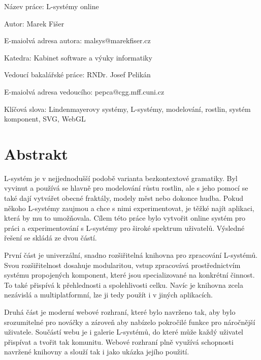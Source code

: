 %
{%
\setlength\parindent{0mm}%
\setlength\parskip{5mm}%
Název práce: L-systémy online

Autor: Marek Fišer

E-maiolvá adresa autora: malsys@marekfiser.cz

Katedra: Kabinet software a výuky informatiky

Vedoucí bakalářské práce: RNDr. Josef Pelikán

E-maiolvá adresa vedoucího: pepca@cgg.mff.cuni.cz

Klíčová slova: Lindenmayerovy systémy, L-systémy, modelování, rostlin, systém komponent, SVG, WebGL

\section*{Abstrakt}
}
\mbox{L-systém} je v nejjednodušší podobě varianta bezkontextové gramatiky.
Byl vyvi\-nut a používá se hlavně pro modelování růstu rostlin, ale s jeho pomocí se také dají vytvářet obecné fraktály, modely měst nebo dokonce hudba.
Pokud někoho \mbox{L-systémy} zaujmou a chce s nimi experimentovat, je těžké najít aplikaci, která by mu to umožňovala.
Cílem této práce bylo vytvořit online systém pro práci a experimentování s L-systémy pro široké spektrum uživatelů.
Výsledné řešení se skládá ze dvou částí.

První část je univerzální, snadno rozšiřitelná knihovna pro zpracování \mbox{L-sys}\-témů.
Svou rozšiřitelnost dosahuje modularitou, vstup zpracovává pros\-třednic\-tvím systému propojených komponent, které jsou specializované na kon\-krét\-ní činnost.
To také přispívá k přehlednosti a spolehlivosti celku.
Navíc je knihovna zcela nezávislá a multiplatformní, lze ji tedy použít i v jiných aplikacích.

Druhá část je moderní webové rozhraní, které bylo navrženo tak, aby bylo srozumitelné pro nováčky a zároveň aby nabízelo pokročilé funkce pro nároč\-nější uživatele.
Součástí webu je i galerie L-systémů, do které může každý uživatel přispívat a tvořit tak komunitu.
Webové rozhraní plně využívá schopnosti navr\-žené knihovny a slouží tak i jako ukázka jejího použití.

